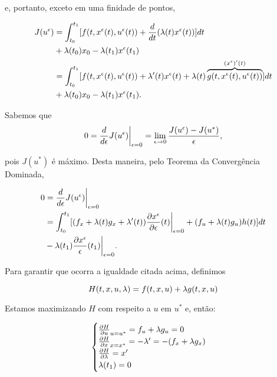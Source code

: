 e, portanto, exceto em uma finidade de pontos,

\begin{equation*}
    \begin{split}
        J(u^{\epsilon}) &= \int_{t_0}^{t_1} [f(t,x^{\epsilon}(t), u^{\epsilon}(t)) + \frac{d}{dt}(\lambda(t)x^{\epsilon}(t))]dt \\
        &+ \lambda(t_0)x_0 - \lambda(t_1)x^{\epsilon}(t_1) \\
        &= \int_{t_0}^{t_1} [f(t, x^{\epsilon}(t), u^{\epsilon}(t)) + \lambda '(t)x^{\epsilon}(t) + \lambda(t)\overbrace{g(t,x^{\epsilon}(t), u^{\epsilon}(t))}^{(x^{\epsilon})'(t)}] dt \\
        &+ \lambda(t_0)x_0 - \lambda(t_1)x^{\epsilon}(t_1).
    \end{split}
\end{equation*}

Sabemos que 
\begin{equation*}
    0 = \frac{d}{d\epsilon} J(u^{\epsilon})\bigg\rvert_{\epsilon = 0} = \lim_{\epsilon \to 0} \frac{J(u^{\epsilon}) - J(u^{*})}{\epsilon}, 
\end{equation*}

pois $J(u^*)$ é máximo. Desta maneira, pelo Teorema da Convergência Dominada, 

\begin{equation*}
    \label{eq1}
    \begin{split}
        0 &= \frac{d}{d\epsilon} J(u^{\epsilon})\bigg\rvert_{\epsilon = 0} \\ 
        &= \int_{t_0}^{t_1} [(f_x + \lambda(t)g_x + \lambda '(t))\frac{\partial x^{\epsilon}}{\partial\epsilon}(t)\bigg\rvert_{\epsilon = 0} + (f_u + \lambda(t)g_u)h(t)]dt \\
        &- \lambda(t_1)\frac{\partial x^{\epsilon}}{\epsilon}(t_1)\bigg\rvert_{\epsilon = 0}.       
    \end{split}
\end{equation*}

Para garantir que ocorra a igualdade citada acima, definimos 

\begin{definition}[Hamiltoniano]
    \label{hamiltonian}
    \begin{equation*}
        H(t,x,u,\lambda) = f(t,x,u) + \lambda g(t, x,u)
    \end{equation*}
\end{definition}

Estamos maximizando $H$ com respeito a $u$ em $u^*$ e, então: 

\begin{equation}
    \begin{cases}
        \frac{\partial H}{\partial u}_{u = u^{*}} = f_u + \lambda g_u = 0 \\
        \frac{\partial H}{\partial x}_{x = x^*} = - \lambda ' = -(f_x + \lambda g_x) \\
        \frac{\partial H}{\partial \lambda} = x' \\
        \lambda(t_1) = 0 
    \end{cases}    
\end{equation}

